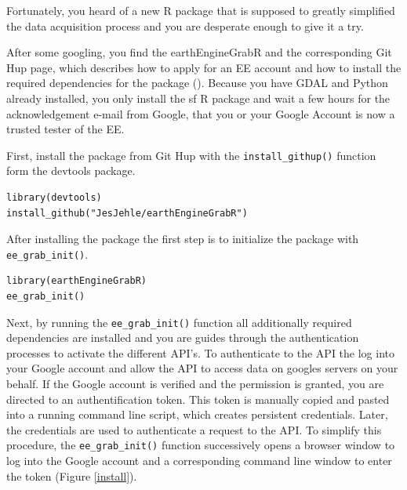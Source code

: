 Fortunately, you heard of a new R package that is supposed to greatly simplified the data acquisition process and you are desperate enough to give it a try. 

After some googling, you find the earthEngineGrabR and the corresponding Git Hup page, which describes how to apply for an EE account and how to install the required dependencies for the package (\cite{earthEngineGrabR}). Because you have GDAL and Python already installed, you only install the sf R package and wait a few hours for the acknowledgement e-mail from Google, that you or your Google Account is now a trusted tester of the EE.

First, install the package from Git Hup with the \texttt{install\_githup()} function form the devtools package.

\begin{lstlisting}
library(devtools)
install_github("JesJehle/earthEngineGrabR")
\end{lstlisting}

After installing the package the first step is to initialize the package with \texttt{ee\_grab\_init()}. 

\begin{lstlisting}
library(earthEngineGrabR)
ee_grab_init()
\end{lstlisting}

Next, by running the \texttt{ee\_grab\_init()} function all additionally required dependencies are installed and you are guides through the authentication processes to activate the different API's. To authenticate to the API the log into your Google account and allow the API to access data on googles servers on your behalf. 
If the Google account is verified and the permission is granted, you are directed to an authentification token. This token is manually copied and pasted into a running command line script, which creates persistent credentials. Later, the credentials are used to authenticate a request to the API. To simplify this procedure, the \texttt{ee\_grab\_init()} function successively opens a browser window to log into the Google account and a corresponding command line window to enter the token (Figure \ref{install}). 


